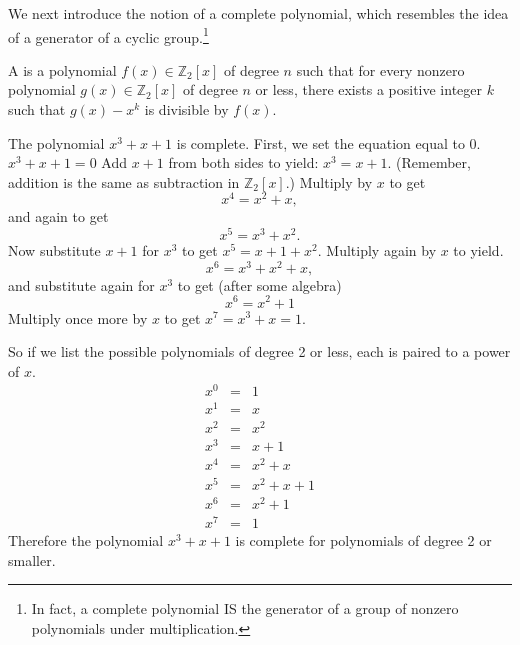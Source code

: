 %
%

We next introduce the notion of a complete polynomial, which resembles the idea of a generator of a cyclic group.\footnote{In fact, a complete polynomial IS the generator of a group of nonzero polynomials under multiplication.} 

\begin{defn}\label{defn:Completepolynomials}
A  is a polynomial $f(x)\in \mathbb{Z}_2[x]$ of degree $n$ such that for every nonzero polynomial $g(x)\in \mathbb{Z}_2[x]$ of degree $n$ or less, there exists a positive integer $k$ such that $g(x)-x^k$  is divisible by $f(x)$.
\end{defn}

\begin{example}
The polynomial $x^3 + x + 1$ is complete.  First, we set the equation equal to 0. $x^3 + x + 1=0$ Add $x+1$ from both sides to yield: $x^3 = x+1$. (Remember, addition is the same as subtraction in $\mathbb{Z}_2[x]$.) Multiply by $x$ to get
\[x^4 = x^2 + x,\]
and again to get
\[x^5 = x^3 + x^2.\] 
Now substitute $x+1$ for $x^3$ to get $x^5 = x + 1 + x^2$. Multiply again by $x$ to yield.
\[x^6 = x^3 + x^2 + x,\]
and substitute again for $x^3$ to get (after some algebra)
\[x^6 = x^2 + 1\]
Multiply once more by $x$ to get $x^7 = x^3 + x = 1.$

So if we list the possible polynomials of degree 2 or less, each is paired to a power of $x$.
\[
\begin{array}{lcr}
x^0 & = & 1 \\
x^1 & = & x \\ 
x^2 & = & x^2 \\ 
x^3 & = & x+1 \\ 
x^4 & = & x^2 + x \\ 
x^5 & = & x^2 + x + 1 \\ 
x^6 & = & x^2 + 1 \\ 
x^7 & = & 1 
\end{array}\]
Therefore the polynomial $x^3 + x + 1$ is complete for polynomials of degree 2 or smaller.  
\end{example}

